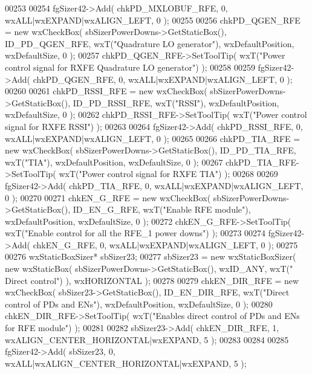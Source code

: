 \begin{DoxyCode}
00253     
00254     fgSizer42->Add( chkPD_MXLOBUF_RFE, 0, wxALL|wxEXPAND|wxALIGN\_LEFT, 0 );
00255     
00256     chkPD_QGEN_RFE = \textcolor{keyword}{new} wxCheckBox( sbSizerPowerDowns->GetStaticBox(), 
      ID_PD_QGEN_RFE, wxT(\textcolor{stringliteral}{"Quadrature LO generator"}), wxDefaultPosition, wxDefaultSize, 0 );
00257     chkPD_QGEN_RFE->SetToolTip( wxT(\textcolor{stringliteral}{"Power control signal for RXFE Quadrature LO generator"}) );
00258     
00259     fgSizer42->Add( chkPD_QGEN_RFE, 0, wxALL|wxEXPAND|wxALIGN\_LEFT, 0 );
00260     
00261     chkPD_RSSI_RFE = \textcolor{keyword}{new} wxCheckBox( sbSizerPowerDowns->GetStaticBox(), 
      ID_PD_RSSI_RFE, wxT(\textcolor{stringliteral}{"RSSI"}), wxDefaultPosition, wxDefaultSize, 0 );
00262     chkPD_RSSI_RFE->SetToolTip( wxT(\textcolor{stringliteral}{"Power control signal for RXFE RSSI"}) );
00263     
00264     fgSizer42->Add( chkPD_RSSI_RFE, 0, wxALL|wxEXPAND|wxALIGN\_LEFT, 0 );
00265     
00266     chkPD_TIA_RFE = \textcolor{keyword}{new} wxCheckBox( sbSizerPowerDowns->GetStaticBox(), 
      ID_PD_TIA_RFE, wxT(\textcolor{stringliteral}{"TIA"}), wxDefaultPosition, wxDefaultSize, 0 );
00267     chkPD_TIA_RFE->SetToolTip( wxT(\textcolor{stringliteral}{"Power control signal for RXFE TIA"}) );
00268     
00269     fgSizer42->Add( chkPD_TIA_RFE, 0, wxALL|wxEXPAND|wxALIGN\_LEFT, 0 );
00270     
00271     chkEN_G_RFE = \textcolor{keyword}{new} wxCheckBox( sbSizerPowerDowns->GetStaticBox(), ID_EN_G_RFE, wxT(\textcolor{stringliteral}{"Enable RFE module"}),
       wxDefaultPosition, wxDefaultSize, 0 );
00272     chkEN_G_RFE->SetToolTip( wxT(\textcolor{stringliteral}{"Enable control for all the RFE\_1 power downs"}) );
00273     
00274     fgSizer42->Add( chkEN_G_RFE, 0, wxALL|wxEXPAND|wxALIGN\_LEFT, 0 );
00275     
00276     wxStaticBoxSizer* sbSizer23;
00277     sbSizer23 = \textcolor{keyword}{new} wxStaticBoxSizer( \textcolor{keyword}{new} wxStaticBox( sbSizerPowerDowns->GetStaticBox(), wxID\_ANY, wxT(\textcolor{stringliteral}{"
      Direct control"}) ), wxHORIZONTAL );
00278     
00279     chkEN_DIR_RFE = \textcolor{keyword}{new} wxCheckBox( sbSizer23->GetStaticBox(), ID_EN_DIR_RFE, wxT(\textcolor{stringliteral}{"Direct control of PDs
       and ENs"}), wxDefaultPosition, wxDefaultSize, 0 );
00280     chkEN_DIR_RFE->SetToolTip( wxT(\textcolor{stringliteral}{"Enables direct control of PDs and ENs for RFE module"}) );
00281     
00282     sbSizer23->Add( chkEN_DIR_RFE, 1, wxALIGN\_CENTER\_HORIZONTAL|wxEXPAND, 5 );
00283     
00284     
00285     fgSizer42->Add( sbSizer23, 0, wxALL|wxALIGN\_CENTER\_HORIZONTAL|wxEXPAND, 5 );

\end{DoxyCode}
